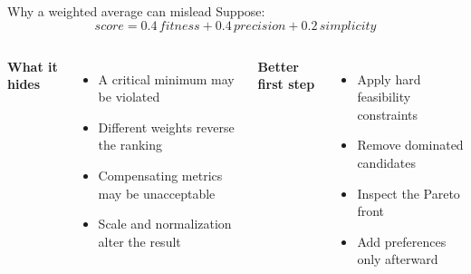 \documentclass[aspectratio=169,11pt]{beamer}
\begin{document}
\begin{frame}{Why a weighted average can mislead}
  Suppose:
  \[
    score = 0.4\,fitness + 0.4\,precision + 0.2\,simplicity
  \]
  \begin{columns}[T,onlytextwidth]
      \textbf{What it hides}
      \begin{itemize}
        \item A critical minimum may be violated
        \item Different weights reverse the ranking
        \item Compensating metrics may be unacceptable
        \item Scale and normalization alter the result
      \end{itemize}
      \textbf{Better first step}
      \begin{itemize}
        \item Apply hard feasibility constraints
        \item Remove dominated candidates
        \item Inspect the Pareto front
        \item Add preferences only afterward
      \end{itemize}
  \end{columns}
\end{frame}
\end{document}
